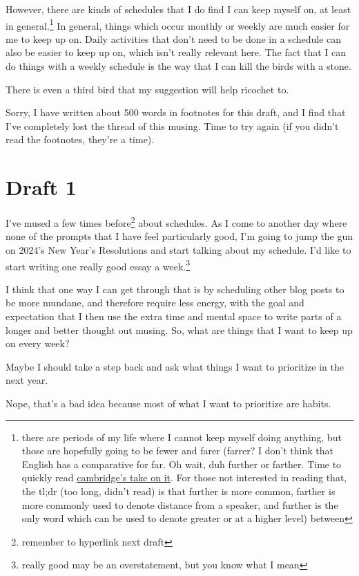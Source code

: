 \documentclass[12pt]{article}[titlepage]
\renewcommand{\,}{\textsuperscript{,}}
\begin{document}
However, there are kinds of schedules that I do find I can keep myself on, at least in general.\footnote{there are periods of my life where I cannot keep myself doing anything, but those are hopefully going to be fewer and farer (farrer? I don't think that English has a comparative for far. Oh wait, duh further or farther. Time to quickly read \href{https://dictionary.cambridge.org/grammar/british-grammar/farther-farthest-or-further-furthest}{cambridge's take on it}. For those not interested in reading that, the tl;dr (too long, didn't read) is that further is more common, farther is more commonly used to denote distance from a speaker, and further is the only word which can be used to denote greater or at a higher level) between}
In general, things which occur monthly or weekly are much easier for me to keep up on.
Daily activities that don't need to be done in a schedule can also be easier to keep up on, which isn't really relevant here.
The fact that I can do things with a weekly schedule is the way that I can kill the birds with a stone.

There is even a third bird that my suggestion will help ricochet to.

Sorry, I have written about 500 words in footnotes for this draft, and I find that I've completely lost the thread of this musing. Time to try again (if you didn't read the footnotes, they're a time).

\section{Draft 1}
I've mused a few times before\footnote{remember to hyperlink next draft} about schedules.
As I come to another day where none of the prompts that I have feel particularly good, I'm going to jump the gun on 2024's New Year's Resolutions and start talking about my schedule.
I'd like to start writing one really good essay a week.\footnote{really good may be an overstatement, but you know what I mean}

I think that one way I can get through that is by scheduling other blog posts to be more mundane, and therefore require less energy, with the goal and expectation that I then use the extra time and mental space to write parts of a longer and better thought out musing.
So, what are things that I want to keep up on every week?

Maybe I should take a step back and ask what things I want to prioritize in the next year.

Nope, that's a bad idea because most of what I want to prioritize are habits.
\end{document}
